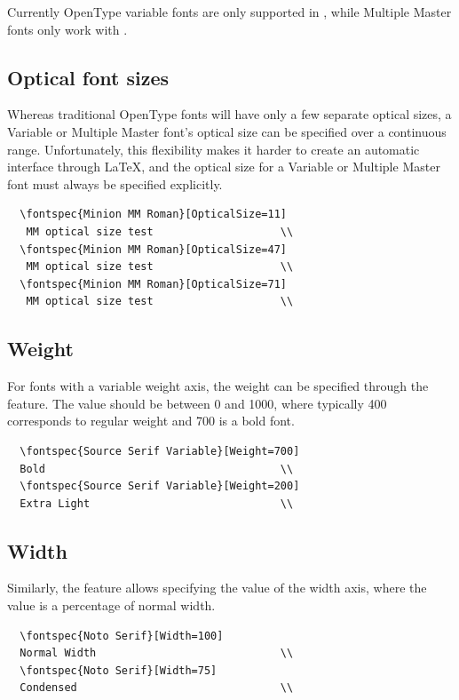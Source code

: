\documentclass[a4paper]{l3doc}
\begin{document}
Currently OpenType variable fonts are only supported in \LuaTeX, while
Multiple Master fonts only work with \XeTeX.

\subsection{Optical font sizes} \label{sec:aat-opticalsize}
Whereas traditional OpenType fonts will have only a few separate
optical sizes, a Variable or Multiple Master font's optical size can be
specified over a continuous range. Unfortunately, this flexibility makes
it harder to create an automatic interface through \LaTeX, and the
optical size for a Variable or Multiple Master font must always be specified
explicitly.
\begin{Verbatim}
  \fontspec{Minion MM Roman}[OpticalSize=11]
   MM optical size test                    \\
  \fontspec{Minion MM Roman}[OpticalSize=47]
   MM optical size test                    \\
  \fontspec{Minion MM Roman}[OpticalSize=71]
   MM optical size test                    \\
\end{Verbatim}


\subsection{Weight} \label{sec:variable-weight}
For fonts with a variable weight axis, the weight can be specified through the
 feature. The value should be between 0 and 1000, where typically
400 corresponds to regular weight and 700 is a bold font.
\begin{Verbatim}
  \fontspec{Source Serif Variable}[Weight=700]
  Bold                                     \\
  \fontspec{Source Serif Variable}[Weight=200]
  Extra Light                              \\
\end{Verbatim}


\subsection{Width} \label{sec:variable-width}
Similarly, the  feature allows specifying the value of the width axis,
where the value is a percentage of normal width.
\begin{Verbatim}
  \fontspec{Noto Serif}[Width=100]
  Normal Width                             \\
  \fontspec{Noto Serif}[Width=75]
  Condensed                                \\
\end{Verbatim}
\end{document}
